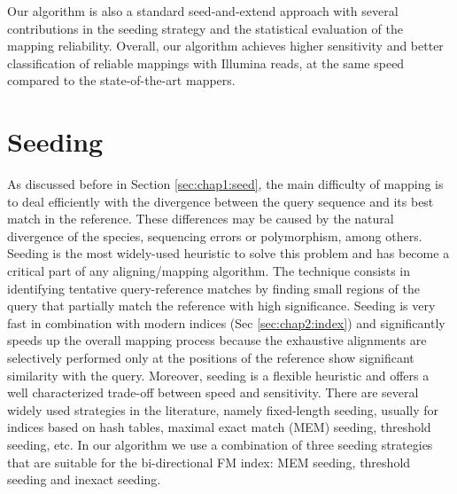 Our algorithm is also a standard seed-and-extend approach with several
contributions in the seeding strategy and the statistical
evaluation of the mapping reliability. Overall, our algorithm achieves
higher sensitivity and better classification of reliable mappings with
Illumina reads, at the same speed compared to the state-of-the-art
mappers.

\section{Seeding}
As discussed before in Section \ref{sec:chap1:seed}, the main
difficulty of mapping is to deal efficiently with the divergence
between the query sequence and its best match in the reference. These
differences may be caused by the natural divergence of the species,
sequencing errors or polymorphism, among others. Seeding is the most
widely-used heuristic to solve this problem and has become a critical
part of any aligning/mapping algorithm. The technique consists in
identifying tentative query-reference matches by finding small regions
of the query that partially match the reference with high
significance. Seeding is very fast in combination with modern indices
(Sec \ref{sec:chap2:index}) and significantly speeds up the overall
mapping process because the exhaustive alignments are selectively
performed only at the positions of the reference show significant
similarity with the query. Moreover, seeding is a flexible heuristic
and offers a well characterized trade-off between speed and
sensitivity. There are several widely used strategies in the
literature, namely fixed-length seeding, usually for indices based on
hash tables, maximal exact match (MEM) seeding, threshold seeding,
etc. In our algorithm we use a combination of three seeding strategies
that are suitable for the bi-directional FM index: MEM seeding,
threshold seeding and inexact seeding. 


